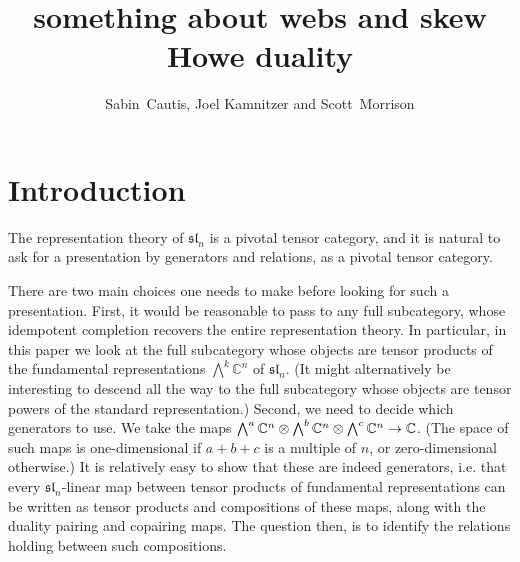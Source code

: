 \documentclass[11pt,leqno]{article}
\title{something about webs and skew Howe duality}
\author{Sabin~Cautis, Joel Kamnitzer and Scott~Morrison}
\begin{document}
\makeatletter
{}
\gdef\theequation{\thesection.\arabic{equation}}
\makeatother

\maketitle

\begin{abstract}
\end{abstract}


\tableofcontents


\newcommand{\Alt}{\bigwedge}

\renewcommand{\sl}[1]{\mathfrak{sl}_{#1}}
\newcommand{\Usl}[1]{U\sl{#1}}

\section{Introduction}
The representation theory of $\sl{n}$ is a pivotal tensor category, and it is natural to ask for a presentation by generators and relations, as a pivotal tensor category.

There are two main choices one needs to make before looking for such a presentation. First, it would be reasonable to pass to any full subcategory, whose idempotent completion recovers the entire representation theory. In particular, in this paper we look at the full subcategory whose objects are tensor products of the fundamental representations $\Alt^k \mathbb C^n$ of $\sl{n}$. (It might alternatively be interesting to descend all the way to the full subcategory whose objects are tensor powers of the standard representation.) Second, we need to decide which generators to use. We take the maps $\Alt^a \mathbb{C}^n \tensor \Alt^b \mathbb{C}^n \tensor \Alt^c \mathbb{C}^n \to \mathbb{C}$. (The space of such maps is one-dimensional if $a+b+c$ is a multiple of $n$, or zero-dimensional otherwise.) It is relatively easy to show that these are indeed generators, i.e. that every $\sl{n}$-linear map between tensor products of fundamental representations can be written as tensor products and compositions of these maps, along with the duality pairing and copairing maps. The question then, is to identify the relations holding between such compositions.
\end{document}
